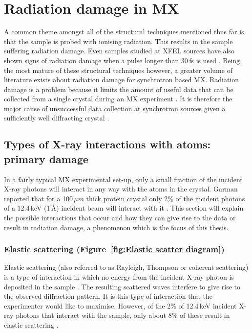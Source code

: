 \section{Radiation damage in MX}
\label{sec:Radiation damage in MX}
    A common theme amongst all of the structural techniques mentioned thus far is that the sample is probed with ionising radiation.
    This results in the sample suffering radiation damage.
    Even samples studied at XFEL sources have also shown signs of radiation damage when a pulse longer than 30$\,$fs is used \cite{nass2015indications}.
    Being the most mature of these structural techniques however, a greater volume of literature exists about radiation damage for synchrotron based MX.
    Radiation damage is a problem because it limits the amount of useful data that can be collected from a single crystal during an MX experiment \cite{garman2010}.
    It is therefore the major cause of unsuccessful data collection at synchrotron sources given a sufficiently well diffracting crystal \cite{zeldin2013dwd}.

    \subsection{Types of X-ray interactions with atoms: primary damage}
    \label{sub:Types of X-ray interactions with atoms: Primary damage}
        In a fairly typical MX experimental set-up, only a small fraction of the incident X-ray photons will interact in any way with the atoms in the crystal.
        Garman reported that for a 100$\,\mu m$ thick protein crystal only 2\% of the incident photons of a 12.4$\,$keV (1$\,$\AA) incident beam will interact with it \cite{garman2010}.
        This section will explain the possible interactions that occur and how they can give rise to the data or result in radiation damage, a phenomenon which is the focus of this thesis.

        \subsubsection{Elastic scattering (Figure~\ref{fig:Elastic scatter diagram})}
        \label{subs:Elastic scattering}
            Elastic scattering (also referred to as Rayleigh, Thompson or coherent scattering) is a type of interaction in which no energy from the incident X-ray photon is deposited in the sample \cite{nave1995}.
            The resulting scattered waves interfere to give rise to the observed diffraction pattern.
            It is this type of interaction that the experimenter would like to maximise.
            However, of the 2\% of 12.4$\,$keV incident X-ray photons that interact with the sample, only about 8\% of these result in elastic scattering \cite{ravelli2006radiation}.

